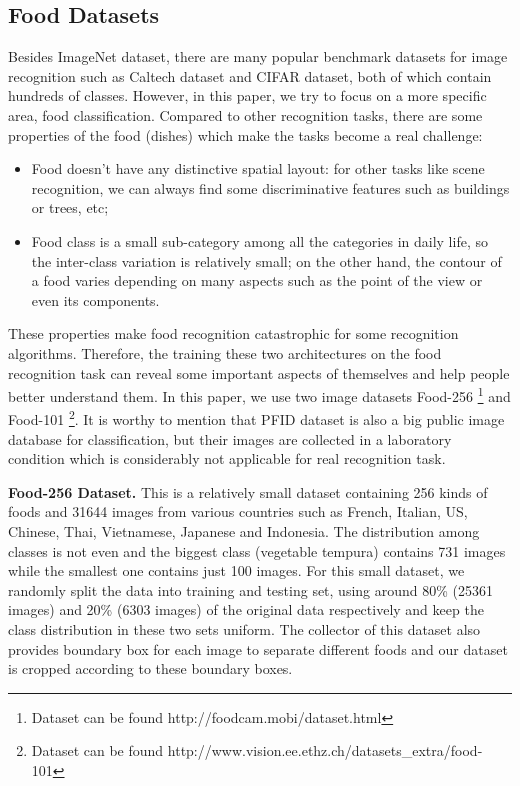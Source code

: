 \subsection{Food Datasets}
Besides ImageNet dataset, there are many popular benchmark datasets for image recognition such as Caltech dataset and CIFAR dataset, both of which contain hundreds of classes. However, in this paper, we try to focus on a more specific area, food classification. Compared to other recognition tasks, there are some properties of the food (dishes) which make the tasks become a real challenge:
\begin{itemize}
  \item Food doesn't have any distinctive spatial layout: for other tasks like scene recognition, we can always find some discriminative features such as buildings or trees, etc;
  \item Food class is a small sub-category among all the categories in daily life, so the inter-class variation is relatively small; on the other hand, the contour of a food varies depending on many aspects such as the point of the view or even its components.
\end{itemize}
These properties make food recognition catastrophic for some recognition algorithms. Therefore, the training these two architectures on the food recognition task can reveal some important aspects of themselves and help people better understand them. In this paper, we use two image datasets Food-256 \cite{kawano14c}\footnote{Dataset can be found http://foodcam.mobi/dataset.html} and Food-101 \cite{bossard14}\footnote{Dataset can be found http://www.vision.ee.ethz.ch/datasets\_extra/food-101}. It is worthy to mention that PFID dataset is also a big public image database for classification, but their images are collected in a laboratory condition which is considerably not applicable for real recognition task.

\textbf{Food-256 Dataset.}
This is a relatively small dataset containing 256 kinds of foods and 31644 images from various countries such as French, Italian, US, Chinese, Thai, Vietnamese, Japanese and Indonesia. The distribution among classes is not even and the biggest class (vegetable tempura) contains 731 images while the smallest one contains just 100 images. For this small dataset, we randomly split the data into training and testing set, using around 80\% (25361 images) and 20\% (6303 images) of the original data respectively and keep the class distribution in these two sets uniform. The collector of this dataset also provides boundary box for each image to separate different foods and our dataset is cropped according to these boundary boxes.

